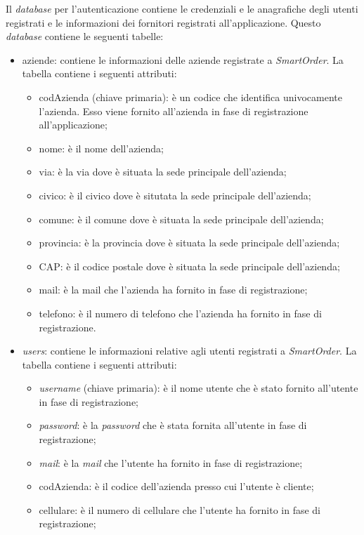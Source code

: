 \documentclass[12pt, a4paper, titlepage]{report}
\begin{document}
	Il \textit{database} per l'autenticazione contiene le credenziali e le anagrafiche degli utenti registrati e le informazioni dei fornitori registrati all'applicazione. Questo \textit{database} contiene le seguenti tabelle:
	\begin{itemize}
		\item aziende: contiene le informazioni delle aziende registrate a \textit{SmartOrder}. La tabella contiene i seguenti attributi:
		\begin{itemize}
			\item codAzienda (chiave primaria): è un codice che identifica univocamente l'azienda. Esso viene fornito all'azienda in fase di registrazione all'applicazione;
			\item nome: è il nome dell'azienda;
			\item via: è la via dove è situata la sede principale dell'azienda;
			\item civico: è il civico dove è situtata la sede principale dell'azienda;
			\item comune: è il comune dove è situata la sede principale dell'azienda;
			\item provincia: è la provincia dove è situata la sede principale dell'azienda;
			\item CAP: è il codice postale dove è situata la sede principale dell'azienda;
			\item mail: è la mail che l'azienda ha fornito in fase di registrazione;
			\item telefono: è il numero di telefono che l'azienda ha fornito in fase di registrazione.
		\end{itemize}
		\item \textit{users}: contiene le informazioni relative agli utenti registrati a \textit{SmartOrder}. La tabella contiene i seguenti attributi:
		\begin{itemize}
			\item \textit{username} (chiave primaria): è il nome utente che è stato fornito all'utente in fase di registrazione;
			\item \textit{password}: è la \textit{password} che è stata fornita all'utente in fase di registrazione;
			\item \textit{mail}: è la \textit{mail} che l'utente ha fornito in fase di registrazione;
			\item codAzienda: è il codice dell'azienda presso cui l'utente è cliente;
			\item cellulare: è il numero di cellulare che l'utente ha fornito in fase di registrazione;

\end{itemize}
\end{itemize}
\end{document}
